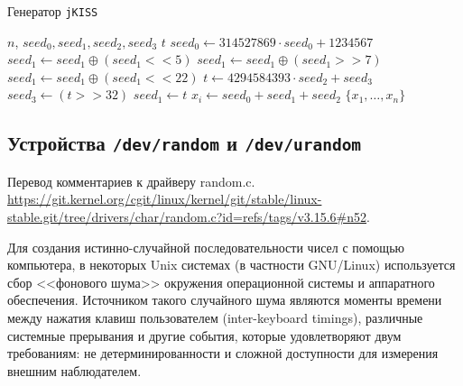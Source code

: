 \documentclass[%
floatfix,
showkeys,
nofootinbib, %
superscriptaddress, %
]{revtex4-1}
\begin{document}
\begin{minipage}[t]{0.5\textwidth}
        \vspace{-10pt}
        \begin{algorithm}[H]
                \begin{algorithmic}
                        \caption{Генератор \texttt{jKISS}}\label{alg:jkiss}
                        \Require $n$, $seed_{0},seed_{1},seed_{2},seed_{3}$
                        \State $t$
                                \State $seed_{0} \leftarrow 314527869 \cdot seed_{0} + 1234567$
                                \State $seed_{1} \leftarrow seed_{1} \oplus (seed_{1} << 5)$
                                \State $seed_{1} \leftarrow seed_{1} \oplus (seed_{1} >> 7)$
                                \State $seed_{1} \leftarrow seed_{1} \oplus (seed_{1} << 22)$
                                \State $t \leftarrow 4294584393\cdot seed_{2} + seed_{3}$
                                \State $seed_{3} \leftarrow (t >> 32)$
                                \State $seed_{1} \leftarrow t$
                                \State $x_{i} \leftarrow seed_{0} + seed_{1} + seed_{2}$
                        \EndFor
                        \State \Return $\{x_{1},\ldots,x_{n}\}$
                \end{algorithmic}
        \end{algorithm}
\end{minipage}


\subsection{Устройства \texttt{/dev/random} и \texttt{/dev/urandom}}

Перевод комментариев к драйверу
random.c. \url{https://git.kernel.org/cgit/linux/kernel/git/stable/linux-stable.git/tree/drivers/char/random.c?id=refs/tags/v3.15.6#n52}.

Для создания истинно-случайной последовательности чисел с помощью
компьютера, в некоторых Unix системах (в частности GNU/Linux)
используется сбор <<фонового шума>> окружения операционной системы и
аппаратного обеспечения. Источником такого случайного шума являются
моменты времени между нажатия клавиш пользователем (inter-keyboard
timings), различные системные прерывания и другие события, которые
удовлетворяют двум требованиям: не детерминированности и сложной
доступности для измерения внешним наблюдателем.
\end{document}
